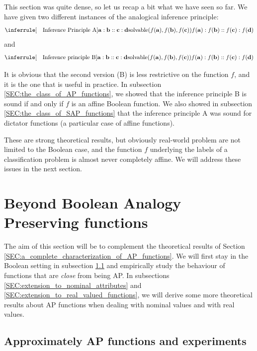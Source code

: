 This section was quite dense, so let us recap a bit what we have seen so far.
We have given two different instances of the analogical inference principle:
$$
\inferrule[\text{~~ Inference Principle A}]{\mathbf{a} : \mathbf{b} ::
\mathbf{c} : \mathbf{d}}{\solvable(f(\mathbf{a}), f(\mathbf{b}),
f(\mathbf{c}))\\\\ f(\mathbf{a}) : f(\mathbf{b}) :: f(\mathbf{c}) :
f(\mathbf{d}) } $$
and
$$
\inferrule[\text{~~ Inference principle B}]{\mathbf{a} : \mathbf{b} ::
\mathbf{c} : \mathbf{d} \\\\ \solvable(f(\mathbf{a}), f(\mathbf{b}),
f(\mathbf{c}))}{f(\mathbf{a}) : f(\mathbf{b}) :: f(\mathbf{c}) : f(\mathbf{d})}
$$

It is obvious that the second version (B) is less restrictive on the function
$f$, and it is the one that is useful in practice. In subsection
\ref{SEC:the_class_of_AP_functions}, we showed that the inference principle B
is sound if and only if $f$ is an affine Boolean function. We also showed in
subsection \ref{SEC:the_class_of_SAP_functions} that the inference principle A
was sound for dictator functions (a particular case of affine functions).

These are strong theoretical results, but obviously real-world problem are not
limited to the Boolean case, and the function $f$ underlying the labels of a
classification problem is almost never completely affine. We will address these
issues in the next section.

\section{Beyond Boolean Analogy Preserving functions}
\label{SEC:beyond_boolean_AP_functions}

The aim of this section will be to complement the theoretical results of
Section \ref{SEC:a_complete_characterization_of_AP_functions}. We will first
stay in the Boolean setting in subsection \ref{SEC:approximate_ap_functions}
and empirically study the behaviour of functions that  are \textit{close} from
being AP. In subsections \ref{SEC:extension_to_nominal_attributes} and
\ref{SEC:extension_to_real_valued_functions}, we will derive some more
theoretical results about AP functions when dealing with nominal values and
with real values.

\subsection{Approximately AP functions and experiments}
\label{SEC:approximate_ap_functions}

